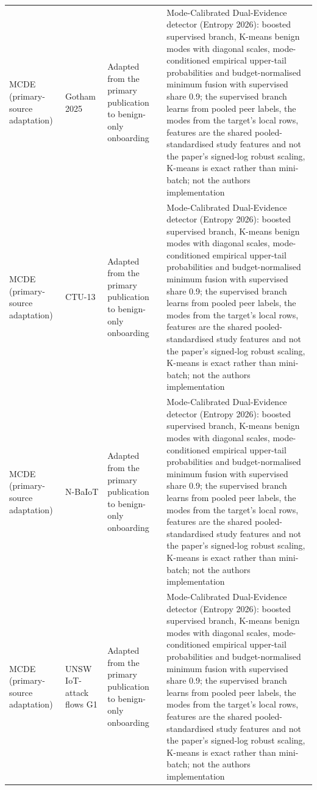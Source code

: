 \begin{tabular}{llll}
MCDE (primary-source adaptation) & Gotham 2025 & Adapted from the primary publication to benign-only onboarding & Mode-Calibrated Dual-Evidence detector (Entropy 2026): boosted supervised branch, K-means benign modes with diagonal scales, mode-conditioned empirical upper-tail probabilities and budget-normalised minimum fusion with supervised share 0.9; the supervised branch learns from pooled peer labels, the modes from the target's local rows, features are the shared pooled-standardised study features and not the paper's signed-log robust scaling, K-means is exact rather than mini-batch; not the authors implementation \\
MCDE (primary-source adaptation) & CTU-13 & Adapted from the primary publication to benign-only onboarding & Mode-Calibrated Dual-Evidence detector (Entropy 2026): boosted supervised branch, K-means benign modes with diagonal scales, mode-conditioned empirical upper-tail probabilities and budget-normalised minimum fusion with supervised share 0.9; the supervised branch learns from pooled peer labels, the modes from the target's local rows, features are the shared pooled-standardised study features and not the paper's signed-log robust scaling, K-means is exact rather than mini-batch; not the authors implementation \\
MCDE (primary-source adaptation) & N-BaIoT & Adapted from the primary publication to benign-only onboarding & Mode-Calibrated Dual-Evidence detector (Entropy 2026): boosted supervised branch, K-means benign modes with diagonal scales, mode-conditioned empirical upper-tail probabilities and budget-normalised minimum fusion with supervised share 0.9; the supervised branch learns from pooled peer labels, the modes from the target's local rows, features are the shared pooled-standardised study features and not the paper's signed-log robust scaling, K-means is exact rather than mini-batch; not the authors implementation \\
MCDE (primary-source adaptation) & UNSW IoT-attack flows G1 & Adapted from the primary publication to benign-only onboarding & Mode-Calibrated Dual-Evidence detector (Entropy 2026): boosted supervised branch, K-means benign modes with diagonal scales, mode-conditioned empirical upper-tail probabilities and budget-normalised minimum fusion with supervised share 0.9; the supervised branch learns from pooled peer labels, the modes from the target's local rows, features are the shared pooled-standardised study features and not the paper's signed-log robust scaling, K-means is exact rather than mini-batch; not the authors implementation \\

\end{tabular}

